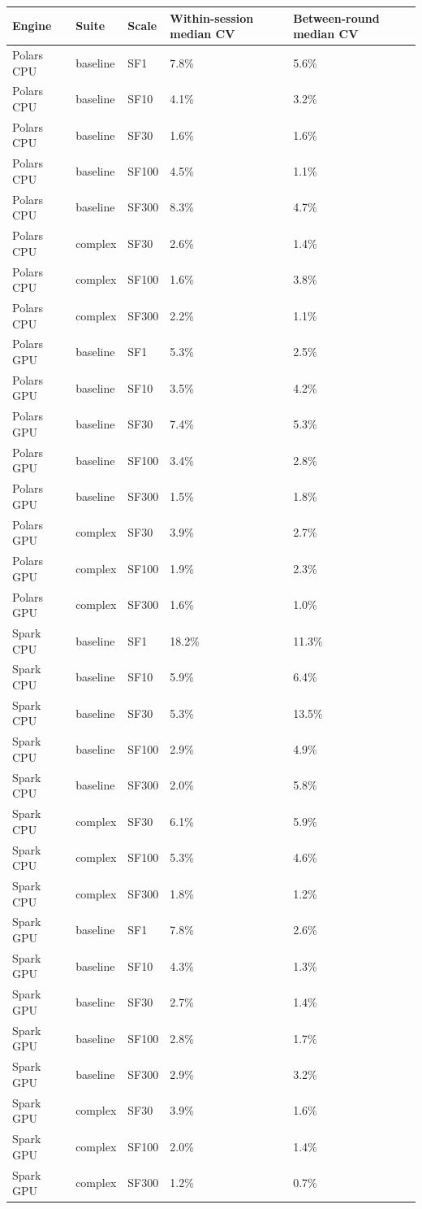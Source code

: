 \begin{tabular}{lllll}
\toprule
Engine & Suite & Scale & Within-session median CV & Between-round median CV \\
\midrule
Polars CPU & baseline & SF1 & 7.8\% & 5.6\% \\
Polars CPU & baseline & SF10 & 4.1\% & 3.2\% \\
Polars CPU & baseline & SF30 & 1.6\% & 1.6\% \\
Polars CPU & baseline & SF100 & 4.5\% & 1.1\% \\
Polars CPU & baseline & SF300 & 8.3\% & 4.7\% \\
Polars CPU & complex & SF30 & 2.6\% & 1.4\% \\
Polars CPU & complex & SF100 & 1.6\% & 3.8\% \\
Polars CPU & complex & SF300 & 2.2\% & 1.1\% \\
Polars GPU & baseline & SF1 & 5.3\% & 2.5\% \\
Polars GPU & baseline & SF10 & 3.5\% & 4.2\% \\
Polars GPU & baseline & SF30 & 7.4\% & 5.3\% \\
Polars GPU & baseline & SF100 & 3.4\% & 2.8\% \\
Polars GPU & baseline & SF300 & 1.5\% & 1.8\% \\
Polars GPU & complex & SF30 & 3.9\% & 2.7\% \\
Polars GPU & complex & SF100 & 1.9\% & 2.3\% \\
Polars GPU & complex & SF300 & 1.6\% & 1.0\% \\
Spark CPU & baseline & SF1 & 18.2\% & 11.3\% \\
Spark CPU & baseline & SF10 & 5.9\% & 6.4\% \\
Spark CPU & baseline & SF30 & 5.3\% & 13.5\% \\
Spark CPU & baseline & SF100 & 2.9\% & 4.9\% \\
Spark CPU & baseline & SF300 & 2.0\% & 5.8\% \\
Spark CPU & complex & SF30 & 6.1\% & 5.9\% \\
Spark CPU & complex & SF100 & 5.3\% & 4.6\% \\
Spark CPU & complex & SF300 & 1.8\% & 1.2\% \\
Spark GPU & baseline & SF1 & 7.8\% & 2.6\% \\
Spark GPU & baseline & SF10 & 4.3\% & 1.3\% \\
Spark GPU & baseline & SF30 & 2.7\% & 1.4\% \\
Spark GPU & baseline & SF100 & 2.8\% & 1.7\% \\
Spark GPU & baseline & SF300 & 2.9\% & 3.2\% \\
Spark GPU & complex & SF30 & 3.9\% & 1.6\% \\
Spark GPU & complex & SF100 & 2.0\% & 1.4\% \\
Spark GPU & complex & SF300 & 1.2\% & 0.7\% \\
\bottomrule
\end{tabular}
